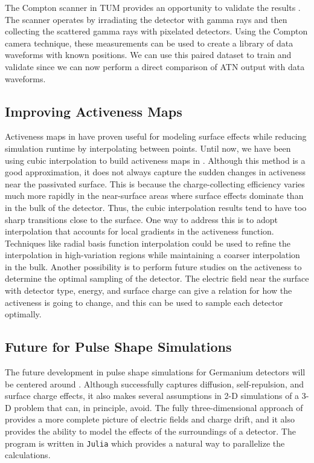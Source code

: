 The Compton scanner in TUM provides an opportunity to validate the {\cpunet} results \cite{Abt_2022odr}. The scanner operates by irradiating the detector with gamma rays and then collecting the scattered gamma rays with pixelated detectors. Using the Compton camera technique, these measurements can be used to create a library of data waveforms with known positions. We can use this paired dataset to train and validate {\cpunet} since we can now perform a direct comparison of ATN output with data waveforms.

\subsection{Improving {\ehd} Activeness Maps}
Activeness maps in {\ehd} have proven useful for modeling surface effects while reducing simulation runtime by interpolating between points. Until now, we have been using cubic interpolation to build activeness maps in {\ehd}. Although this method is a good approximation, it does not always capture the sudden changes in activeness near the passivated surface. This is because the charge-collecting efficiency varies much more rapidly in the near-surface areas where surface effects dominate than in the bulk of the detector. Thus, the cubic interpolation results tend to have too sharp transitions close to the surface. One way to address this is to adopt interpolation that accounts for local gradients in the activeness function. Techniques like radial basis function interpolation could be used to refine the interpolation in high-variation regions while maintaining a coarser interpolation in the bulk. Another possibility is to perform future studies on the activeness to determine the optimal sampling of the detector. The electric field near the surface with detector type, energy, and surface charge can give a relation for how the activeness is going to change, and this can be used to sample each detector optimally.

\subsection{Future for Pulse Shape Simulations}
The future development in pulse shape simulations for Germanium detectors will be centered around {\ssd} . Although {\ehd} successfully captures diffusion, self-repulsion, and surface charge effects, it also makes several assumptions in 2-D simulations of a 3-D problem that {\ssd} can, in principle, avoid. The fully three-dimensional approach of {\ssd} provides a more complete picture of electric fields and charge drift, and it also provides the ability to model the effects of the surroundings of a detector. The program is written in \texttt{Julia} which provides a natural way to parallelize the calculations.

